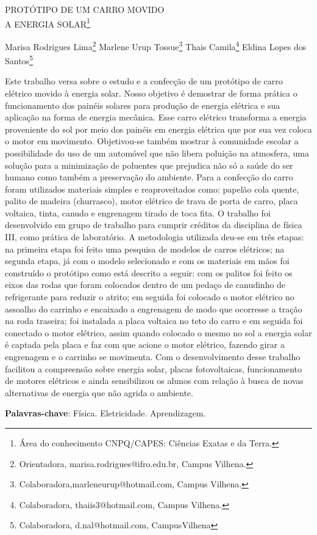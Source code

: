 \documentclass[article,12pt,onesidea,4paper,english,brazil]{abntex2}
\begin{document}
	
	
	\frenchspacing 
	
	\begin{center}
		\LARGE PROTÓTIPO DE UM CARRO MOVIDO\\A ENERGIA SOLAR\footnote{Área do conhecimento CNPQ/CAPES: Ciências Exatas e da Terra.}
		
		\normalsize
		Marisa Rodrigues Lima\footnote{Orientadora, marisa.rodrigues@ifro.edu.br, Campus Vilhena.} 
		Marlene Urup Tossue\footnote{Colaboradora,marleneurup@hotmail.com, Campus Vilhena.} 
		Thais Camila\footnote{Colaboradora, thaiis3@hotmail.com, Campus Vilhena.} 
		Eldina Lopes dos Santos\footnote{Colaboradora, d.nal@hotmail.com, CampusVilhena} 
	\end{center}
	
	\noindent Este trabalho versa sobre o estudo e a confecção de um protótipo de carro elétrico movido à energia solar. Nosso objetivo é demostrar de forma prática o funcionamento dos painéis solares para produção de energia elétrica e sua aplicação na forma de energia mecânica. Esse carro elétrico transforma a energia proveniente do sol por meio dos painéis em energia elétrica que por sua vez coloca o motor em movimento. Objetivou-se também mostrar à comunidade escolar a possibilidade do uso de um automóvel que não libera poluição na atmosfera, uma solução para a minimização de poluentes que prejudica não só a saúde do ser humano como também a preservação do ambiente. Para a confecção do carro foram utilizados materiais simples e reaproveitados como: papelão cola quente, palito de madeira (churrasco), motor elétrico de trava de porta de carro, placa voltaica, tinta, canudo e engrenagem tirado de toca fita. O trabalho foi desenvolvido em grupo de trabalho para cumprir créditos da disciplina de física III, como prática de laboratório. A metodologia utilizada deu-se em três etapas: na primeira etapa foi feito uma pesquisa de modelos de carros elétricos; na segunda etapa, já com o modelo selecionado e com os materiais em mãos foi construído o protótipo como está descrito a seguir: com os palitos foi feito os eixos das rodas que foram colocados dentro de um pedaço de canudinho de refrigerante para reduzir o atrito; em seguida foi colocado o motor elétrico no assoalho do carrinho e encaixado a engrenagem de modo que ocorresse a tração na roda traseira; foi instalada a placa voltaica no teto do carro e em seguida foi conectado o motor elétrico, assim quando colocado o mesmo no sol a energia solar é captada pela placa e faz com que acione o motor elétrico, fazendo girar a engrenagem e o carrinho se movimenta. Com o desenvolvimento desse trabalho facilitou a compreensão sobre energia solar, placas fotovoltaicas, funcionamento de motores elétricos e ainda sensibilizou os alunos com relação à busca de novas alternativas de energia que não agrida o ambiente.
	
	\vspace{\onelineskip}
	
	\noindent
	\textbf{Palavras-chave}: Física. Eletricidade. Aprendizagem.
	
\end{document}
